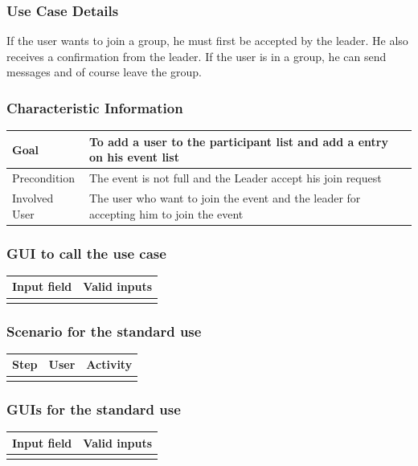 \documentclass[12pt]{article}
\theoremstyle{definition}
\begin{document}
\subsubsection{Use Case Details}

If the user wants to join a group, he must first be accepted by the leader. He also receives a confirmation from the leader. If the user is in a group, he can send messages and of course leave the group.
\subsubsection{Characteristic Information}

\begin{tabular}{|l|l|}
\hline
Goal & To add a user to the participant list and add a entry on his event list \\ \hline
Precondition &  The event is not full and the Leader accept his join request\\ \hline
Involved User &  The user who want to join the event and the leader for accepting him to join the event\\ \hline

\end{tabular}

\subsubsection{GUI to call the use case}

\begin{tabular}{|l|l|}
\hline
Input field & Valid inputs \\ \hline
 &  \\ \hline
\end{tabular}

\subsubsection{Scenario for the standard use}

\begin{tabular}{|l|l|l|}
\hline
Step & User & Activity \\ \hline
 & & \\ \hline
\end{tabular}

\subsubsection{GUIs for the standard use}
\begin{tabular}{|l|l|}
\hline
Input field & Valid inputs \\ \hline
 &  \\ \hline
\end{tabular}
\end{document}
